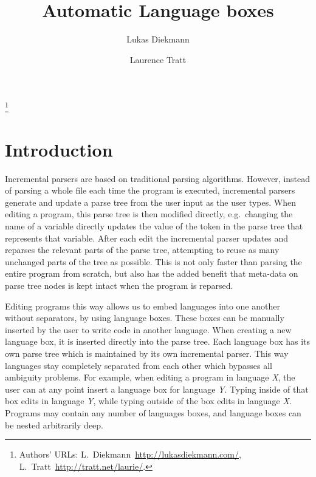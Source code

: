 \documentclass[sigplan,screen]{acmart}\settopmatter{printfolios=true,printccs=false,printacmref=false}
\begin{document}
\title{Automatic Language boxes}

\author{Lukas Diekmann}
\author{Laurence Tratt}
\thanks{Authors' URLs: %
    L.~Diekmann~\url{http://lukasdiekmann.com/},
    L.~Tratt~\url{http://tratt.net/laurie/}.
}


\begin{abstract}
\end{abstract}


\maketitle

\section{Introduction}

Incremental parsers are based on traditional parsing algorithms. However,
instead of parsing a whole file each time the program is executed, incremental
parsers generate and update a parse tree from the user input as the user types.
When editing a program, this parse tree is then modified directly,
e.g.~changing the name of a variable directly updates the value of the token in
the parse tree that represents that variable. After each edit the incremental
parser updates and reparses the relevant parts of the parse tree, attempting to
reuse as many unchanged parts of the tree as possible. This is not only faster
than parsing the entire program from scratch, but also has the added benefit
that meta-data on parse tree nodes is kept intact when the program is reparsed.

Editing programs this way allows us to embed languages into one another without
separators, by using language boxes. These boxes can be manually inserted by
the user to write code in another language. When creating a new language box,
it is inserted directly into the parse tree. Each language box has its own
parse tree which is maintained by its own incremental parser. This way
languages stay completely separated from each other which bypasses all
ambiguity problems. For example, when editing a program in language \emph{X},
the user can at any point insert a language box for language \emph{Y}. Typing
inside of that box edits in language \emph{Y}, while typing outside of the box
edits in language \emph{X}. Programs may contain any number of languages
boxes, and language boxes can be nested arbitrarily deep.
\end{document}
